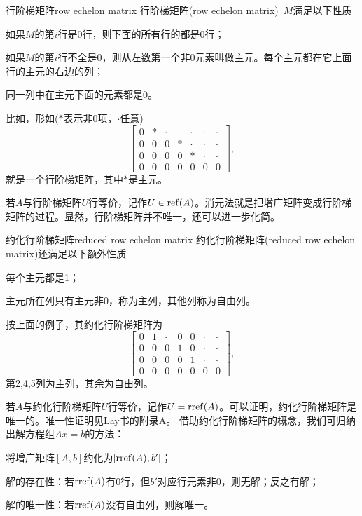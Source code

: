 \begin{definition}{行阶梯矩阵}{row echelon matrix}
	行阶梯矩阵(row echelon matrix)~$M$满足以下性质
	\begin{compactitem}
		\item 如果$M$的第$i$行是0行，则下面的所有行的都是0行；
		\item 如果$M$的第$i$行不全是0，则从左数第一个非0元素叫做主元。每个主元都在它上面行的主元的右边的列；
		\item 同一列中在主元下面的元素都是0。
	\end{compactitem}
	比如，形如($\ast$表示非0项，$\cdot$任意)
	\[
		\begin{bmatrix}
			0&\ast&\cdot&\cdot&\cdot&\cdot&\cdot\\
			0&0&0&\ast&\cdot&\cdot&\cdot\\
			0&0&0&0&\ast&\cdot&\cdot\\
			0&0&0&0&0&0&0
		\end{bmatrix},
	\]
	就是一个行阶梯矩阵，其中$\ast$是主元。
\end{definition}
若$A$与行阶梯矩阵$U$行等价，记作$U\in\operatorname{ref}(A)$。消元法就是把增广矩阵变成行阶梯矩阵的过程。显然，行阶梯矩阵并不唯一，还可以进一步化简。
\begin{definition}{约化行阶梯矩阵}{reduced row echelon matrix}
	约化行阶梯矩阵(reduced row echelon matrix)还满足以下额外性质
	\begin{compactitem}
		\item 每个主元都是1；
		\item 主元所在列只有主元非0，称为主列，其他列称为自由列。
	\end{compactitem}
	按上面的例子，其约化行阶梯矩阵为
	\[
		\begin{bmatrix}
			0&1&\cdot&0&0&\cdot&\cdot\\
			0&0&0&1&0&\cdot&\cdot\\
			0&0&0&0&1&\cdot&\cdot\\
			0&0&0&0&0&0&0
		\end{bmatrix},
	\]
	第2,4,5列为主列，其余为自由列。
\end{definition}
若$A$与约化行阶梯矩阵$U$行等价，记作$U=\operatorname{rref}(A)$。可以证明，约化行阶梯矩阵是唯一的。唯一性证明见Lay书的附录A。
借助约化行阶梯矩阵的概念，我们可归纳出解方程组$Ax=b$的方法：
\begin{compactitem}
	\item 将增广矩阵$[A,b]$约化为$[\operatorname{rref}(A),b']$；
	\item 解的存在性：若$\operatorname{rref}(A)$有0行，但$b'$对应行元素非0，则无解；反之有解；
	\item 解的唯一性：若$\operatorname{rref}(A)$没有自由列，则解唯一。
\end{compactitem}
